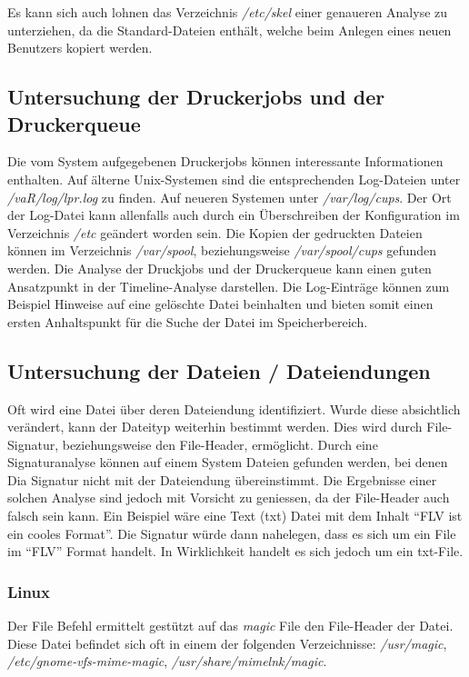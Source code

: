 Es kann sich auch lohnen das Verzeichnis \textit{/etc/skel} einer genaueren Analyse zu unterziehen, da die Standard-Dateien enthält, welche beim Anlegen eines neuen Benutzers kopiert werden.
	

\subsection{Untersuchung der Druckerjobs und der Druckerqueue}
Die vom System aufgegebenen Druckerjobs können interessante Informationen enthalten. Auf älterne Unix-Systemen sind die entsprechenden Log-Dateien unter \textit{/vaR/log/lpr.log} zu finden. Auf neueren Systemen unter \textit{/var/log/cups}. Der Ort der Log-Datei kann allenfalls auch durch ein Überschreiben der Konfiguration im Verzeichnis \textit{/etc} geändert worden sein. Die Kopien der gedruckten Dateien können im Verzeichnis \textit{/var/spool}, beziehungsweise \textit{/var/spool/cups} gefunden werden. Die Analyse der Druckjobs und der Druckerqueue kann einen guten Ansatzpunkt in der Timeline-Analyse darstellen. Die Log-Einträge können zum Beispiel Hinweise auf eine gelöschte Datei beinhalten und bieten somit einen ersten Anhaltspunkt für die Suche der Datei im Speicherbereich.



\subsection{Untersuchung der Dateien / Dateiendungen}
Oft wird eine Datei über deren Dateiendung identifiziert. Wurde diese absichtlich verändert, kann der Dateityp weiterhin bestimmt werden. Dies wird durch File-Signatur, beziehungsweise den File-Header, ermöglicht. Durch eine Signaturanalyse können auf einem System Dateien gefunden werden, bei denen Dia Signatur nicht mit der Dateiendung übereinstimmt. Die Ergebnisse einer solchen Analyse sind jedoch mit Vorsicht zu geniessen, da der File-Header auch falsch sein kann. Ein Beispiel wäre eine Text (txt) Datei mit dem Inhalt "`FLV ist ein cooles Format"'. Die Signatur würde dann nahelegen, dass es sich um ein File im "`FLV"' Format handelt. In Wirklichkeit handelt es sich jedoch um ein txt-File.


\subsubsection{Linux}
Der File Befehl ermittelt gestützt auf das \textit{magic} File den File-Header der Datei. Diese Datei befindet sich oft in einem der folgenden Verzeichnisse: \textit{/usr/magic}, \textit{/etc/gnome-vfs-mime-magic}, \textit{/usr/share/mimelnk/magic}.

